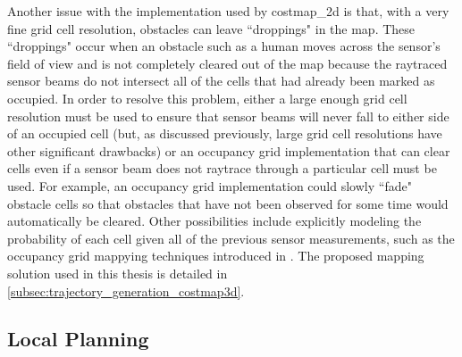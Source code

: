 Another issue with the implementation used by costmap\_2d is that, with a very fine grid cell resolution, obstacles can leave ``droppings" in the map. These ``droppings" occur when an obstacle such as a human moves across the sensor's field of view and is not completely cleared out of the map because the raytraced sensor beams do not intersect all of the cells that had already been marked as occupied. In order to resolve this problem, either a large enough grid cell resolution must be used to ensure that sensor beams will never fall to either side of an occupied cell (but, as discussed previously, large grid cell resolutions have other significant drawbacks) or an occupancy grid implementation that can clear cells even if a sensor beam does not raytrace through a particular cell must be used. For example, an occupancy grid implementation could slowly ``fade" obstacle cells so that obstacles that have not been observed for some time would automatically be cleared. Other possibilities include explicitly modeling the probability of each cell given all of the previous sensor measurements, such as the occupancy grid mappying techniques introduced in \autocite{Moravec_1985_1840}. The proposed mapping solution used in this thesis is detailed in \autoref{subsec:trajectory_generation_costmap3d}.

\subsection{Local Planning}\label{subsec:base_local_planner}

